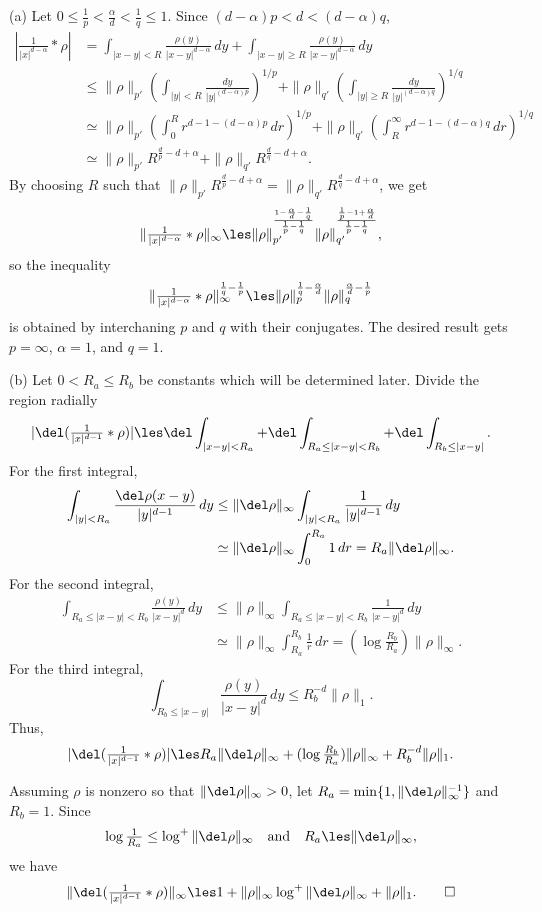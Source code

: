 \documentclass[11pt]{amsart}
\begin{document}
\begin{pf}
(a)
Let $0\le\frac1p<\frac\alpha d<\frac1q\le1$.
Since $(d-\alpha)p<d<(d-\alpha)q$,
\begin{align*}
|\tfrac1{|x|^{d-\alpha}}*\rho|
&=\int_{|x-y|<R}\frac{\rho(y)}{|x-y|^{d-\alpha}}\,dy+\int_{|x-y|\ge R}\frac{\rho(y)}{|x-y|^{d-\alpha}}\,dy\\
&\le\|\rho\|_{p'}(\int_{|y|<R}\frac{dy}{|y|^{(d-\alpha)p}})^{1/p}+\|\rho\|_{q'}(\int_{|y|\ge R}\frac{dy}{|y|^{(d-\alpha)q}})^{1/q}\\
&\simeq\|\rho\|_{p'}(\int_0^Rr^{d-1-(d-\alpha)p}\,dr)^{1/p}+\|\rho\|_{q'}(\int_R^\infty r^{d-1-(d-\alpha)q}\,dr)^{1/q}\\
&\simeq\|\rho\|_{p'}R^{\frac dp-d+\alpha}+\|\rho\|_{q'}R^{\frac dq-d+\alpha}.
\end{align*}
By choosing $R$ such that $\|\rho\|_{p'}R^{\frac dp-d+\alpha}=\|\rho\|_{q'}R^{\frac dq-d+\alpha}$, we get
\[\|\tfrac1{|x|^{d-\alpha}}*\rho\|_\infty\les\|\rho\|_{p'}^{\frac{1-\frac\alpha d-\frac1q}{\frac1p-\frac1q}}\|\rho\|_{q'}^{\frac{\frac1p-1+\frac\alpha d}{\frac1p-\frac1q}},\]
so the inequality
\[\|\tfrac1{|x|^{d-\alpha}}*\rho\|_\infty^{\frac1q-\frac1p}\les\|\rho\|_p^{\frac1q-\frac\alpha d}\|\rho\|_q^{\frac\alpha d-\frac1p}\]
is obtained by interchaning $p$ and $q$ with their conjugates.
The desired result gets $p=\infty$, $\alpha=1$, and $q=1$.

(b)
Let $0<R_a\le R_b$ be constants which will be determined later.
Divide the region radially
\begin{align*}
|\del(\tfrac1{|x|^{d-1}}*\rho)|\les\del\int_{|x-y|<R_a}+\del\int_{R_a\le|x-y|<R_b}+\del\int_{R_b\le|x-y|}.
\end{align*}
For the first integral,
\begin{align*}
\int_{|y|<R_a}\frac{\del\rho(x-y)}{|y|^{d-1}}\,dy
&\le\|\del\rho\|_\infty\int_{|y|<R_a}\frac1{|y|^{d-1}}\,dy\\
&\simeq\|\del\rho\|_\infty\int_0^{R_a}1\,dr
=R_a\|\del\rho\|_\infty.
\end{align*}
For the second integral,
\begin{align*}
\int_{R_a\le|x-y|<R_b}\frac{\rho(y)}{|x-y|^d}\,dy
&\le\|\rho\|_\infty\int_{R_a\le|x-y|<R_b}\frac1{|x-y|^d}\,dy\\
&\simeq\|\rho\|_\infty\int_{R_a}^{R_b}\frac1r\,dr
=(\log\tfrac{R_b}{R_a})\|\rho\|_\infty.
\end{align*}
For the third integral,
\[\int_{R_b\le|x-y|}\frac{\rho(y)}{|x-y|^d}\,dy\le R_b^{-d}\|\rho\|_1.\]
Thus,
\[|\del(\tfrac1{|x|^{d-1}}*\rho)|\les R_a\|\del\rho\|_\infty+(\log\tfrac{R_b}{R_a})\|\rho\|_\infty+R_b^{-d}\|\rho\|_1.\]

Assuming $\rho$ is nonzero so that $\|\del\rho\|_\infty>0$, let $R_a=\min\{1,\|\del\rho\|_\infty^{-1}\}$ and $R_b=1$.
Since
\[\log\tfrac1{R_a}\le\log^+\|\del\rho\|_\infty\quad\text{and}\quad R_a\les\|\del\rho\|_\infty,\]
we have
\[\|\del(\tfrac1{|x|^{d-1}}*\rho)\|_\infty\les1+\|\rho\|_\infty\log^+\|\del\rho\|_\infty+\|\rho\|_1.\qedhere\]
\end{pf}
\end{document}
